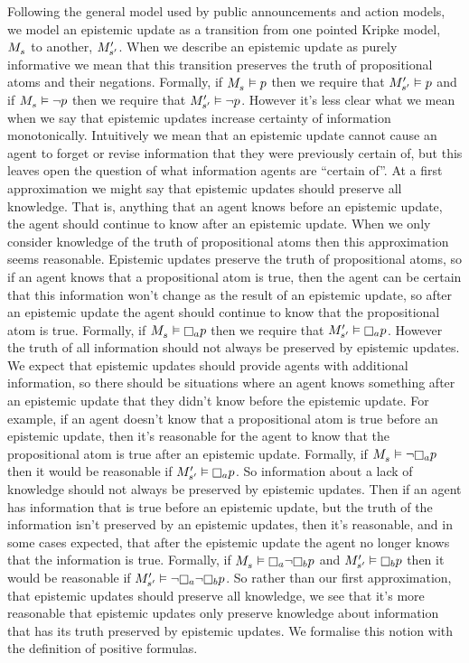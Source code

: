 Following the general model used by public announcements and action models, we model an epistemic update as a transition from one pointed Kripke model, $\kPModel{\kStateS}$ to another, ${M^{\prime}_{{s}^{\prime}}}$.
When we describe an epistemic update as purely informative we mean that this transition preserves the truth of propositional atoms and their negations.
Formally, if $\kPModel{\kStateS} \entails \atomP$ then we require that ${M^{\prime}_{{s}^{\prime}}} \vDash p$ and if $\kPModel{\kStateS} \entails \lnot \atomP$ then we require that ${M^{\prime}_{{s}^{\prime}}} \vDash \lnot p$.
However it's less clear what we mean when we say that epistemic updates increase certainty of information monotonically.
Intuitively we mean that an epistemic update cannot cause an agent to forget or revise information that they were previously certain of, but this leaves open the question of what information agents are ``certain of''.
At a first approximation we might say that epistemic updates should preserve all knowledge.
That is, anything that an agent knows before an epistemic update, the agent should continue to know after an epistemic update.
When we only consider knowledge of the truth of propositional atoms then this approximation seems reasonable.
Epistemic updates preserve the truth of propositional atoms, so if an agent knows that a propositional atom is true, then the agent can be certain that this information won't change as the result of an epistemic update, so after an epistemic update the agent should continue to know that the propositional atom is true.
Formally, if $\kPModel{\kStateS} \entails \knowsA \atomP$ then we require that $\kPModelP{\kStateSP} \entails \knowsA \atomP$.
However the truth of all information should not always be preserved by epistemic updates.
We expect that epistemic updates should provide agents with additional information, so there should be situations where an agent knows something after an epistemic update that they didn't know before the epistemic update.
For example, if an agent doesn't know that a propositional atom is true before an epistemic update, then it's reasonable for the agent to know that the propositional atom is true after an epistemic update.
Formally, if $\kPModel{\kStateS} \entails \lnot \knowsA \atomP$ then it would be reasonable if $\kPModelP{\kStateSP} \entails \knowsA \atomP$.
So information about a lack of knowledge should not always be preserved by epistemic updates.
Then if an agent has information that is true before an epistemic update, but the truth of the information isn't preserved by an epistemic updates, then it's reasonable, and in some cases expected, that after the epistemic update the agent no longer knows that the information is true.
Formally, if $\kPModel{\kStateS} \entails \knowsA \lnot \knowsB \atomP$ and $\kPModelP{\kStateSP} \entails \knowsB \atomP$ then it would be reasonable if $\kPModelP{\kStateSP} \entails \lnot \knowsA \lnot \knowsB \atomP$.
So rather than our first approximation, that epistemic updates should preserve all knowledge, we see that it's more reasonable that epistemic updates only preserve knowledge about information that has its truth preserved by epistemic updates.
We formalise this notion with the definition of positive formulas.

